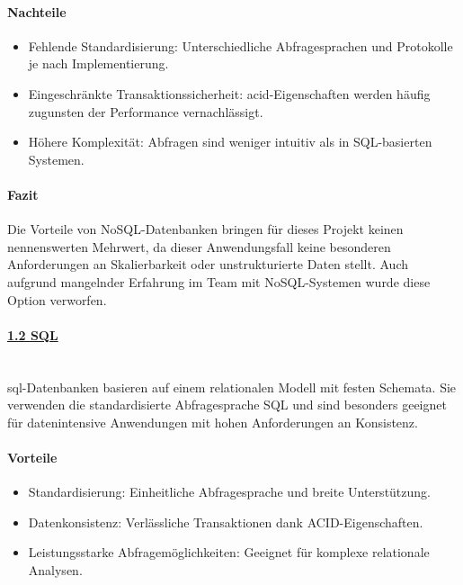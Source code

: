 \documentclass[a4paper,12pt]{report}
\begin{document}
    \paragraph*{Nachteile}
    \begin{itemize}
        \item Fehlende Standardisierung: Unterschiedliche Abfragesprachen und Protokolle je nach Implementierung.
        \item Eingeschränkte Transaktionssicherheit: \gls{acid}-Eigenschaften werden häufig zugunsten der Performance vernachlässigt.
        \item Höhere Komplexität: Abfragen sind weniger intuitiv als in SQL-basierten Systemen.
    \end{itemize}

    \paragraph*{Fazit}
    Die Vorteile von NoSQL-Datenbanken bringen für dieses Projekt keinen nennenswerten Mehrwert, da dieser Anwendungsfall keine besonderen Anforderungen an Skalierbarkeit oder unstrukturierte Daten stellt.
    Auch aufgrund mangelnder Erfahrung im Team mit NoSQL-Systemen wurde diese Option verworfen.

    \paragraph*{\underline{1.2 SQL}}\mbox{}\\
    \gls{sql}-Datenbanken basieren auf einem relationalen Modell mit festen Schemata.
    Sie verwenden die standardisierte Abfragesprache SQL und sind besonders geeignet für datenintensive Anwendungen mit hohen Anforderungen an Konsistenz.

    \paragraph*{Vorteile}
    \begin{itemize}
        \item Standardisierung: Einheitliche Abfragesprache und breite Unterstützung.
        \item Datenkonsistenz: Verlässliche Transaktionen dank ACID-Eigenschaften.
        \item Leistungsstarke Abfragemöglichkeiten: Geeignet für komplexe relationale Analysen.
    \end{itemize}
\end{document}
